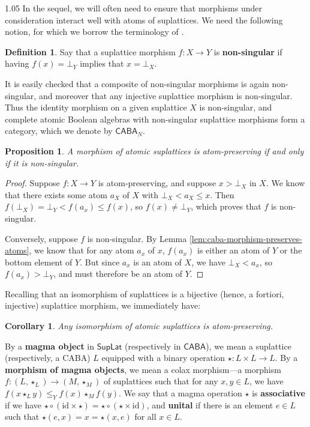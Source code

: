 \documentclass[reqno]{amsart}
\newcommand{\cat}{\mathsf}
\numberwithin{equation}{section}
\theoremstyle{plain}
\newtheorem{corollary}[equation]{Corollary}
\newtheorem{proposition}[equation]{Proposition}
\theoremstyle{definition}
\newtheorem{definition}[equation]{Definition}
\begin{document}
\begin{spacing}{1.05}
In the sequel, we will often need to ensure that morphisms under consideration interact well with atoms of suplattices. We need the following notion, for which we borrow the terminology of \cite{Crapo_1967}.

\begin{definition}
    Say that a suplattice morphism $f : X \to Y$ is \textbf{non-singular} if having $f(x) = \bot_Y$ implies that $x = \bot_X$.
\end{definition}

It is easily checked that a composite of non-singular morphisms is again non-singular, and moreover that any injective suplattice morphism is non-singular. Thus the identity morphism on a given suplattice $X$ is non-singular, and complete atomic Boolean algebras with non-singular suplattice morphisms form a category, which we denote by $\cat{CABA}_N$.

\begin{proposition} \label{prop:atom-preserving-nonsingular}
    A morphism of atomic suplattices is atom-preserving if and only if it is non-singular.
\end{proposition}

\begin{proof}
    Suppose $f : X \to Y$ is atom-preserving, and suppose $x > \bot_X$ in $X$. We know that there exists some atom $a_X$ of $X$ with $\bot_X < a_X \leq x$. Then $f(\bot_X) = \bot_Y < f(a_x) \leq f(x)$, so $f(x) \neq \bot_Y$, which proves that $f$ is non-singular. 

    Conversely, suppose $f$ is non-singular. By Lemma \ref{lem:caba-morphism-preserves-atoms}, we know that for any atom $a_x$ of $x$, $f(a_x)$ is either an atom of $Y$ or the bottom element of $Y$. But since $a_x$ is an atom of $X$, we have $\bot_X < a_x$, so $f(a_x) > \bot_Y$, and must therefore be an atom of $Y$.
\end{proof}

Recalling that an isomorphism of suplattices is a bijective (hence, a fortiori, injective) suplattice morphism, we immediately have:

\begin{corollary} \label{cor:isomorphism-atom-preserving}
    Any isomorphism of atomic suplattices is atom-preserving.
\end{corollary}

By a \textbf{magma object} in $\cat{SupLat}$ (respectively in $\cat{CABA}$), we mean a suplattice (respectively, a CABA) $L$ equipped with a binary operation $\star : L \times L \to L$. By a \textbf{morphism of magma objects}, we mean a colax morphism---a morphism $f: (L, \star_L) \to (M, \star_M)$ of suplattices such that for any $x,y \in L$, we have $f(x \star_L y) \leq_Y f(x) \star_M f(y)$. We say that a magma operation $\star$ is \textbf{associative} if we have $\star \circ (\text{id} \times \star) = \star \circ (\star \times \text{id})$, and \textbf{unital} if there is an element $e \in L$ such that $\star(e,x) = x = \star(x,e)$ for all $x \in L$.


\end{spacing}
\end{document}

